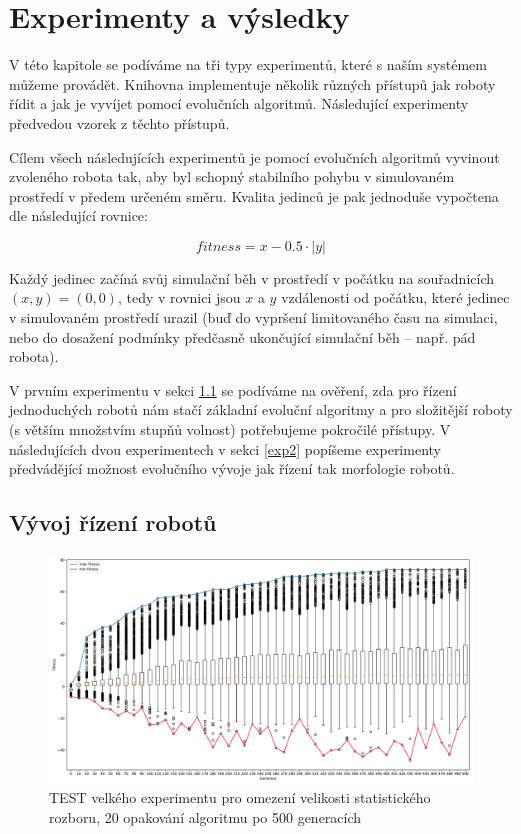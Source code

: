 \chapter{Experimenty a výsledky}

V této kapitole se podíváme na tři typy experimentů, které s naším systémem
můžeme provádět. Knihovna implementuje několik různých přístupů jak roboty
řídit a jak je vyvíjet pomocí evolučních algoritmů. Následující experimenty
předvedou vzorek z těchto přístupů. 

Cílem všech následujících experimentů je pomocí evolučních algoritmů vyvinout
zvoleného robota tak, aby byl schopný stabilního pohybu v simulovaném prostředí
v předem určeném směru. Kvalita jedinců je pak jednoduše vypočtena dle
následující rovnice:

\begin{equation} \label{fitness_calc}
    fitness = x - 0.5\cdot|y|
\end{equation}

Každý jedinec začíná svůj simulační běh v prostředí v počátku na souřadnicích
$(x,y) = (0,0)$, tedy v rovnici \label{fitness_calc} jsou $x$ a $y$ vzdálenosti
od počátku, které jedinec v simulovaném prostředí urazil (buď do vypršení
limitovaného času na simulaci, nebo do dosažení podmínky předčasně ukončující
simulační běh -- např. pád robota).

V prvním experimentu v sekci \ref{exp1} se podíváme na ověření, zda pro řízení
jednoduchých robotů nám stačí základní evoluční algoritmy a pro složitější
roboty (s větším množstvím stupňů volnost) potřebujeme pokročilé přístupy.
V následujících dvou experimentech v sekci \ref{exp2} popíšeme experimenty
předvádějící možnost evolučního vývoje jak řízení tak morfologie robotů.

\section{Vývoj řízení robotů} \label{exp1}

\begin{figure}[!htb]
    \centering
    \includegraphics[width=1\textwidth]{../img/BIGexperiment1_TFS_10ticks.pdf}
    \caption{TEST velkého experimentu pro omezení velikosti statistického
    rozboru, 20 opakování algoritmu po 500 generacích}
\end{figure}

